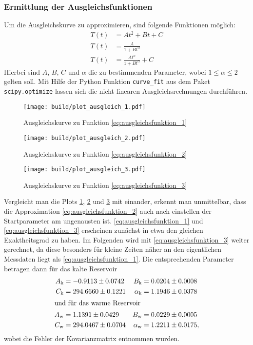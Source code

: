 \subsubsection[]{Ermittlung der Ausgleichsfunktionen}
Um die Ausgleichskurve zu approximieren, sind folgende Funktionen möglich:
\begin{align}
    T \left(t\right) &= A t^2 + B t + C \label{eq:ausgleichsfunktion_1} \\
    T \left(t\right) &= \frac{A}{1 + B t^{\alpha}} \label{eq:ausgleichsfunktion_2} \\
    T \left(t\right) &= \frac{A t^{\alpha}}{1 + B t^{\alpha}} + C \label{eq:ausgleichsfunktion_3}
\end{align}
Hierbei sind $A$, $B$, $C$ und $\alpha$ die zu bestimmenden Parameter, wobei $1 \leq \alpha \leq 2$ gelten soll.
Mit Hilfe der Python \cite[]{python} Funktion \texttt{curve\_fit} aus dem Paket \texttt{scipy.optimize} 
\cite[]{scipy} lassen sich die nicht-linearen Ausgleichsrechnungen durchführen.
\begin{figure}
    \texttt{[image: build/plot\_ausgleich\_1.pdf]}
    \caption[]{Ausgleichskurve zu Funktion \eqref{eq:ausgleichsfunktion_1}}
    \label{fig:ausgleichsplot_1}
\end{figure}
\begin{figure}
    \texttt{[image: build/plot\_ausgleich\_2.pdf]}
    \caption[]{Ausgleichskurve zu Funktion \eqref{eq:ausgleichsfunktion_2}}
    \label{fig:ausgleichsplot_2}
\end{figure}
\begin{figure}
    \texttt{[image: build/plot\_ausgleich\_3.pdf]}
    \caption[]{Ausgleichskurve zu Funktion \eqref{eq:ausgleichsfunktion_3}}
    \label{fig:ausgleichsplot_3}
\end{figure}
Vergleicht man die Plots \ref{fig:ausgleichsplot_1}, \ref{fig:ausgleichsplot_2} und \ref{fig:ausgleichsplot_3} mit einander,
erkennt man unmittelbar, dass die Approximation \eqref{eq:ausgleichsfunktion_2} auch nach einstellen der Startparameter am ungenausten ist.
\eqref{eq:ausgleichsfunktion_1} und \eqref{eq:ausgleichsfunktion_3} erscheinen zunächst in etwa den gleichen Exaktheitsgrad zu haben.
Im Folgenden wird mit \eqref{eq:ausgleichsfunktion_3} weiter gerechnet, da diese besonders für kleine Zeiten näher an den eigentlichen Messdaten liegt
als \eqref{eq:ausgleichsfunktion_1}.
Die entsprechenden Parameter betragen dann für das kalte Reservoir
\begin{align*}
    A_{\text{k}} &= -0.9113 \pm 0.0742 & B_{\text{k}} &= 0.0204 \pm 0.0008 \\
    C_{\text{k}} &= 294.6660 \pm 0.1221 & \alpha_{\text{k}} &= 1.1946 \pm 0.0378 \\
    \intertext{und für das warme Reservoir}
    A_{\text{w}} &= 1.1391 \pm 0.0429 & B_{\text{w}} &= 0.0229  \pm 0.0005 \\
    C_{\text{w}} &= 294.0467 \pm 0.0704 & \alpha_{\text{w}} &= 1.2211 \pm 0.0175,
\end{align*}
wobei die Fehler der Kovarianzmatrix entnommen wurden.


